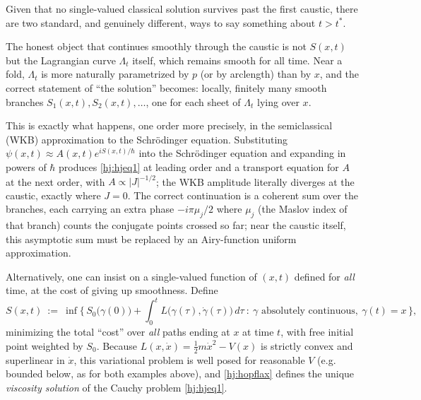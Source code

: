 Given that no single-valued classical solution survives past the first caustic,
there are two standard, and genuinely different, ways to say something about
$t>t^\ast$.

The honest object that continues smoothly through the caustic is not $S(x,t)$
but the Lagrangian curve $\Lambda_t$ itself, which remains smooth for all time.
Near a fold, $\Lambda_t$ is more naturally parametrized by $p$ (or by
arclength) than by $x$, and the correct statement of ``the solution'' becomes:
locally, finitely many smooth branches $S_1(x,t),S_2(x,t),\dots$, one for each
sheet of $\Lambda_t$ lying over $x$.

This is exactly what happens, one order more precisely, in the semiclassical
(WKB) approximation to the Schr\"odinger equation. Substituting
$\psi(x,t)\approx A(x,t)e^{iS(x,t)/\hbar}$ into the Schr\"odinger equation and
expanding in powers of $\hbar$ produces \eqref{hj:hjeq1} at leading order and a
transport equation for $A$ at the next order, with $A\propto |J|^{-1/2}$; the
WKB amplitude literally diverges at the caustic, exactly where $J=0$. The
correct continuation is a coherent sum over the branches, each carrying an
extra phase $-i\pi\mu_j/2$ where $\mu_j$ (the Maslov index of that branch)
counts the conjugate points crossed so far; near the caustic itself, this
asymptotic sum must be replaced by an Airy-function uniform approximation.

Alternatively, one can insist on a single-valued function of $(x,t)$ defined
for \emph{all} time, at the cost of giving up smoothness. Define
\begin{equation}
S(x,t) \ :=\ \inf\Big\{\, S_0\big(\gamma(0)\big) + \int_0^tL\big(\gamma(\tau),
    \dot\gamma(\tau)\big)\,d\tau \ :\ \gamma \text{ absolutely continuous},
    \ \gamma(t)=x \,\Big\},
\label{hj:hopflax}
\end{equation}
minimizing the total ``cost'' over \emph{all} paths ending at $x$ at time $t$,
with free initial point weighted by $S_0$. Because $L(x,\dot x)=\tfrac12m\dot
x^2-V(x)$ is strictly convex and superlinear in $\dot x$, this variational
problem is well posed for reasonable $V$ (e.g. bounded below, as for both
examples above), and \eqref{hj:hopflax} defines the unique \emph{viscosity
solution} of the Cauchy problem \eqref{hj:hjeq1}.

